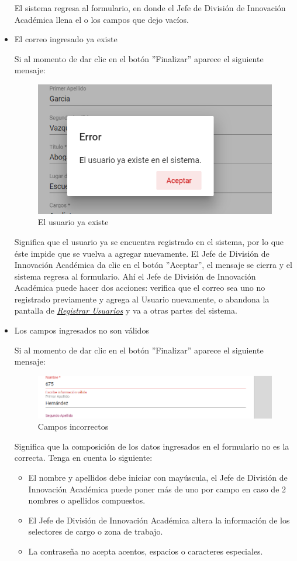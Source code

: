 \begin{itemize}
	El sistema regresa  al formulario, en donde el Jefe de División de Innovación Académica  llena el o los campos que dejo vacíos.
	\item El correo ingresado ya existe
	
	Si al momento de dar clic en el botón ''Finalizar'' aparece el siguiente mensaje:
	
	\begin{figure}[H]
		\centering
		\includegraphics[width=0.4\linewidth]{images/SP5/MSG36}
		\caption{El usuario ya existe}
		\label{mensaje36}
		
	\end{figure}
	
	Significa que el usuario ya se encuentra registrado en el sistema, por lo que éste impide que se vuelva a agregar nuevamente. El Jefe de División de Innovación Académica  da clic en el botón ''Aceptar'', el mensaje se cierra y el sistema regresa al formulario. Ahí el Jefe de División de Innovación Académica  puede hacer dos acciones: verifica que el correo sea uno no registrado previamente y agrega al Usuario nuevamente, o abandona la pantalla de \hyperlink{registrarUs}{\textit{Registrar Usuarios}} y va a otras partes del sistema.
	
	\item Los campos ingresados no son válidos
	
	Si al momento de dar clic en el botón ''Finalizar'' aparece el siguiente mensaje:
	
	\begin{figure}[H]
		\centering
		\includegraphics[width=0.4\linewidth]{images/SP5/MSG35}
		\caption{Campos incorrectos}
		\label{mensaje35}
		
	\end{figure}
	
	
	Significa que la composición de los datos ingresados en el formulario no es la correcta. Tenga en cuenta lo siguiente:
	
	\begin{itemize}
		\item El nombre y apellidos debe iniciar con mayúscula, el Jefe de División de Innovación Académica  puede poner más de uno por campo en caso de 2 nombres o apellidos compuestos.
		\item El Jefe de División de Innovación Académica  altera la información de los selectores de cargo o zona de trabajo.
		\item La contraseña no acepta acentos, espacios o caracteres especiales.
	\end{itemize}
\end{itemize}
